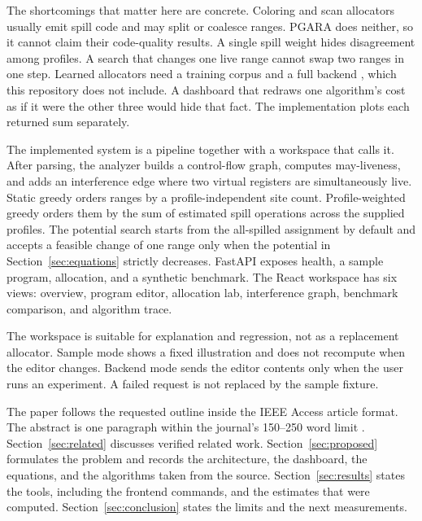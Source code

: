 \documentclass{ieeeaccess}
\begin{document}
The shortcomings that matter here are concrete.
Coloring and scan allocators usually emit spill code and may split or coalesce ranges.
PGARA does neither, so it cannot claim their code-quality results.
A single spill weight hides disagreement among profiles.
A search that changes one live range cannot swap two ranges in one step.
Learned allocators need a training corpus and a full backend \cite{silva2024,venkatakeerthy2022}, which this repository does not include.
A dashboard that redraws one algorithm's cost as if it were the other three would hide that fact.
The implementation plots each returned sum separately.

The implemented system is a pipeline together with a workspace that calls it.
After parsing, the analyzer builds a control-flow graph, computes may-liveness, and adds an interference edge where two virtual registers are simultaneously live.
Static greedy orders ranges by a profile-independent site count.
Profile-weighted greedy orders them by the sum of estimated spill operations across the supplied profiles.
The potential search starts from the all-spilled assignment by default and accepts a feasible change of one range only when the potential in Section~\ref{sec:equations} strictly decreases.
FastAPI exposes health, a sample program, allocation, and a synthetic benchmark.
The React workspace has six views: overview, program editor, allocation lab, interference graph, benchmark comparison, and algorithm trace.

The workspace is suitable for explanation and regression, not as a replacement allocator.
Sample mode shows a fixed illustration and does not recompute when the editor changes.
Backend mode sends the editor contents only when the user runs an experiment.
A failed request is not replaced by the sample fixture.

The paper follows the requested outline inside the IEEE Access article format.
The abstract is one paragraph within the journal's 150--250 word limit \cite{ieeeaccess-authors}.
Section~\ref{sec:related} discusses verified related work.
Section~\ref{sec:proposed} formulates the problem and records the architecture, the dashboard, the equations, and the algorithms taken from the source.
Section~\ref{sec:results} states the tools, including the frontend commands, and the estimates that were computed.
Section~\ref{sec:conclusion} states the limits and the next measurements.
\end{document}
